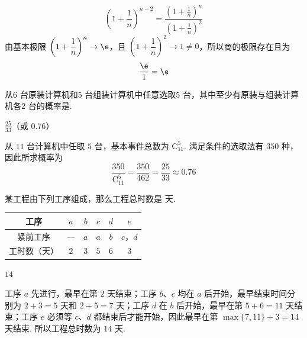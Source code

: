 \documentclass[UTF8,a4paper,oneside,11pt]{ctexbook}
\begin{document}
\begin{solution}
\[
\left(1+\frac1n\right)^{n-2}=\frac{\left(1+\frac1n\right)^n}{\left(1+\frac1n\right)^2}
\]
由基本极限 \(\left(1+\dfrac1n\right)^n\to\e\)，且 \(\left(1+\dfrac1n\right)^2\to1\ne0\)，所以商的极限存在且为
\[
\frac{\e}{1}=\e
\]
\end{solution}

\begin{problem}[B]
从\(6\text{ 台}\)原装计算机和\(5\text{ 台}\)组装计算机中任意选取\(5\text{ 台}\)，其中至少有原装与组装计算机各\(2\text{ 台}\)的概率是\fillinblank{}.
\end{problem}

\begin{answer}
\(\frac{25}{33}\)（或 \(0.76\)）
\end{answer}

\begin{solution}
从 \(11\) 台计算机中任取 \(5\) 台，基本事件总数为 \(\mathrm C_{11}^5\). 满足条件的选取法有 \(350\) 种，因此所求概率为
\[
\frac{350}{\mathrm C_{11}^5}=\frac{350}{462}=\frac{25}{33}\approx0.76
\]
\end{solution}

\begin{problem}[B]
某工程由下列工序组成，那么工程总时数是\fillinblank{} \(\text{天}\).

\begin{center}
\begin{tabular}{|c|c|c|c|c|c|}
\hline
工序 & \(a\) & \(b\) & \(c\) & \(d\) & \(e\) \\
\hline
紧前工序 & — & \(a\) & \(a\) & \(b\) & \(c\)，\(d\) \\
\hline
工时数（天） & \(2\) & \(3\) & \(5\) & \(6\) & \(3\) \\
\hline
\end{tabular}
\end{center}
\end{problem}

\begin{answer}
\(14\)
\end{answer}

\begin{solution}
工序 \(a\) 先进行，最早在第 \(2\) 天结束；工序 \(b\)、\(c\) 均在 \(a\) 后开始，最早结束时间分别为 \(2+3=5\) 天和 \(2+5=7\) 天；工序 \(d\) 在 \(b\) 后开始，最早在第 \(5+6=11\) 天结束；工序 \(e\) 必须等 \(c\)、\(d\) 都结束后才能开始，因此最早在第 \(\max\{7,11\}+3=14\) 天结束. 所以工程总时数为 \(14\) 天.
\end{solution}
\end{document}
